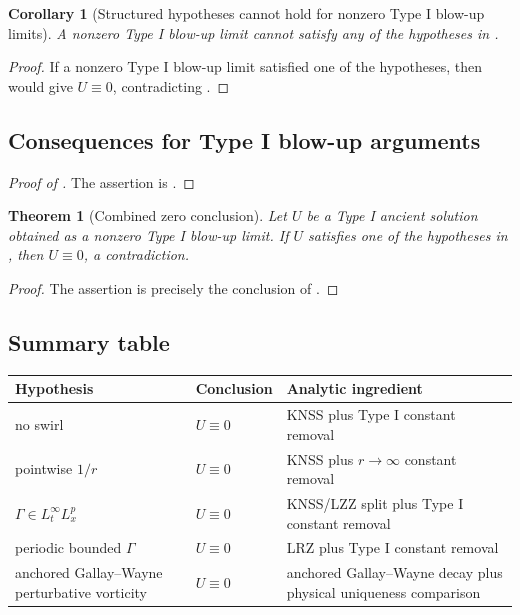 \documentclass[11pt]{amsart}
\theoremstyle{plain}
\newtheorem{theorem}{Theorem}[section]
\newtheorem{corollary}[corollary]{Corollary}
\theoremstyle{definition}
\theoremstyle{remark}
\numberwithin{equation}{section}
\begin{document}
\begin{corollary}[Structured hypotheses cannot hold for nonzero Type I blow-up limits]
\label{p3:cor:structured-hypotheses-nonzero-blowup}
A nonzero Type I blow-up limit cannot satisfy any of the hypotheses in
.
\end{corollary}

\begin{proof}
If a nonzero Type I blow-up limit satisfied one of the hypotheses, then
 would give \(U\equiv0\), contradicting
.
\end{proof}

\subsection{Consequences for Type I blow-up arguments}

\begin{proof}[Proof of ]
The assertion is .
\end{proof}

\begin{theorem}[Combined zero conclusion]
\label{p3:thm:stated-hypotheses-zero}
Let \(U\) be a Type I ancient solution obtained as a nonzero Type I blow-up
limit.  If \(U\) satisfies one of the hypotheses in
, then \(U\equiv0\), a contradiction.
\end{theorem}

\begin{proof}
The assertion is precisely the conclusion of
.
\end{proof}

\subsection{Summary table}

\begin{center}
\begin{tabular}{p{}p{}p{}}
\hline
Hypothesis & Conclusion & Analytic ingredient \\
\hline
no swirl & \(U\equiv0\) & KNSS plus Type I constant removal \\
pointwise \(1/r\) & \(U\equiv0\) & KNSS plus \(r\to\infty\) constant removal \\
\(\Gamma\in L_t^\infty L_x^p\) & \(U\equiv0\) & KNSS/LZZ split plus Type I constant removal \\
periodic bounded \(\Gamma\) & \(U\equiv0\) & LRZ plus Type I constant removal \\
anchored Gallay--Wayne perturbative vorticity & \(U\equiv0\) & anchored Gallay--Wayne decay plus physical uniqueness comparison \\
\hline
\end{tabular}
\end{center}
\end{document}
